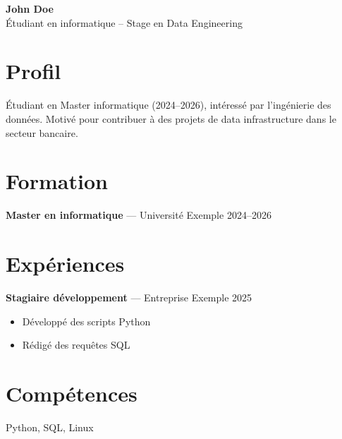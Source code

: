 \documentclass[11pt,a4paper]{article}
\begin{document}
\begin{center}
{\LARGE\bfseries John Doe }\\[3pt]
Étudiant en informatique – Stage en Data Engineering
\end{center}

\section*{Profil}
Étudiant en Master informatique (2024–2026), intéressé par l'ingénierie des données. Motivé pour contribuer à des projets de data infrastructure dans le secteur bancaire.

\section*{Formation}

\textbf{Master en informatique} --- Université Exemple \hfill 2024–2026\par


\section*{Expériences}

\textbf{Stagiaire développement} --- Entreprise Exemple \hfill 2025\par
\begin{itemize}

\item Développé des scripts Python

\item Rédigé des requêtes SQL

\end{itemize}


\section*{Compétences}
Python, SQL, Linux
\end{document}
